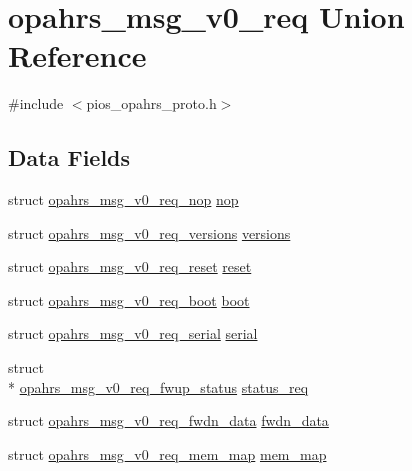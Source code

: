 \hypertarget{unionopahrs__msg__v0__req}{\section{opahrs\-\_\-msg\-\_\-v0\-\_\-req Union Reference}
\label{unionopahrs__msg__v0__req}
}


{\ttfamily \#include $<$pios\-\_\-opahrs\-\_\-proto.\-h$>$}

\subsection*{Data Fields}
\begin{DoxyCompactItemize}
\item 
struct \hyperlink{structopahrs__msg__v0__req__nop}{opahrs\-\_\-msg\-\_\-v0\-\_\-req\-\_\-nop} \hyperlink{unionopahrs__msg__v0__req_a32d0393f76afbbe97fc454e33283cee1}{nop}
\item 
struct \hyperlink{structopahrs__msg__v0__req__versions}{opahrs\-\_\-msg\-\_\-v0\-\_\-req\-\_\-versions} \hyperlink{unionopahrs__msg__v0__req_a814872efb9f992c52dd61f95c10b0366}{versions}
\item 
struct \hyperlink{structopahrs__msg__v0__req__reset}{opahrs\-\_\-msg\-\_\-v0\-\_\-req\-\_\-reset} \hyperlink{unionopahrs__msg__v0__req_acb5491cb4850c02860cbfed8b507c877}{reset}
\item 
struct \hyperlink{structopahrs__msg__v0__req__boot}{opahrs\-\_\-msg\-\_\-v0\-\_\-req\-\_\-boot} \hyperlink{unionopahrs__msg__v0__req_af965183b84782f01b4f9b90cb2299cc0}{boot}
\item 
struct \hyperlink{structopahrs__msg__v0__req__serial}{opahrs\-\_\-msg\-\_\-v0\-\_\-req\-\_\-serial} \hyperlink{unionopahrs__msg__v0__req_ad28569a7d93f8cc5a4776b44c87fe0b2}{serial}
\item 
struct \\*
\hyperlink{structopahrs__msg__v0__req__fwup__status}{opahrs\-\_\-msg\-\_\-v0\-\_\-req\-\_\-fwup\-\_\-status} \hyperlink{unionopahrs__msg__v0__req_a490017a1017d529f7bec057577d0a9ae}{status\-\_\-req}
\item 
struct \hyperlink{structopahrs__msg__v0__req__fwdn__data}{opahrs\-\_\-msg\-\_\-v0\-\_\-req\-\_\-fwdn\-\_\-data} \hyperlink{unionopahrs__msg__v0__req_a5b45e9edc10e3e83f03b936607ddcb76}{fwdn\-\_\-data}
\item 
struct \hyperlink{structopahrs__msg__v0__req__mem__map}{opahrs\-\_\-msg\-\_\-v0\-\_\-req\-\_\-mem\-\_\-map} \hyperlink{unionopahrs__msg__v0__req_ae7015e9b8e2297ee30f63871354a648f}{mem\-\_\-map}

\end{DoxyCompactItemize}
